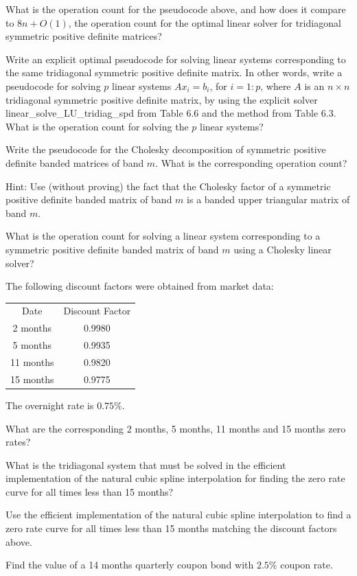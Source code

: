 \begin{exercises}
\begin{subparts}
\item What is the operation count for the pseudocode above, and how does it compare to
$8n + O(1)$, the operation count for the optimal linear solver for tridiagonal
symmetric positive definite matrices?
\end{subparts}

\item Write an explicit optimal pseudocode for solving linear systems corresponding to
the same tridiagonal symmetric positive definite matrix. In other words, write a
pseudocode for solving $p$ linear systems $Ax_i = b_i$, for $i = 1:p$, where $A$ is an
$n \times n$ tridiagonal symmetric positive definite matrix, by using the explicit
solver linear\_solve\_LU\_tridiag\_spd from Table 6.6 and the method from Table 6.3.
What is the operation count for solving the $p$ linear systems?

\item Write the pseudocode for the Cholesky decomposition of symmetric positive
definite banded matrices of band $m$. What is the corresponding operation count?

\noindent Hint: Use (without proving) the fact that the Cholesky factor of a symmetric
positive definite banded matrix of band $m$ is a banded upper triangular matrix of band
$m$.

\item What is the operation count for solving a linear system corresponding to a
symmetric positive definite banded matrix of band $m$ using a Cholesky linear solver?

\item The following discount factors were obtained from market data:
\begin{center}
\begin{tabular}{cc}
Date & Discount Factor \\[0.4em]
2 months & 0.9980 \\
5 months & 0.9935 \\
11 months & 0.9820 \\
15 months & 0.9775
\end{tabular}
\end{center}

The overnight rate is $0.75\%$.

\begin{subparts}
\item What are the corresponding 2 months, 5 months, 11 months and 15 months zero
rates?
\item What is the tridiagonal system that must be solved in the efficient
implementation of the natural cubic spline interpolation for finding the zero rate
curve for all times less than 15 months?
\item Use the efficient implementation of the natural cubic spline interpolation to
find a zero rate curve for all times less than 15 months matching the discount factors
above.
\item Find the value of a 14 months quarterly coupon bond with $2.5\%$ coupon rate.
\end{subparts}


\end{exercises}

